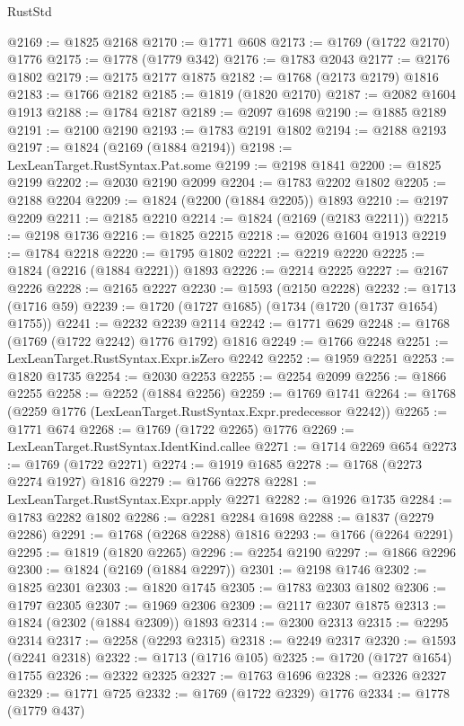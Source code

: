 \begin{lexlean}{RustStd}
\begin{coremodule}
@2169 := @1825 @2168
@2170 := @1771 @608
@2173 := @1769 (@1722 @2170) @1776
@2175 := @1778 (@1779 @342)
@2176 := @1783 @2043
@2177 := @2176 @1802
@2179 := @2175 @2177 @1875
@2182 := @1768 (@2173 @2179) @1816
@2183 := @1766 @2182
@2185 := @1819 (@1820 @2170)
@2187 := @2082 @1604 @1913
@2188 := @1784 @2187
@2189 := @2097 @1698
@2190 := @1885 @2189
@2191 := @2100 @2190
@2193 := @1783 @2191 @1802
@2194 := @2188 @2193
@2197 := @1824 (@2169 (@1884 @2194))
@2198 := LexLeanTarget.RustSyntax.Pat.some
@2199 := @2198 @1841
@2200 := @1825 @2199
@2202 := @2030 @2190 @2099
@2204 := @1783 @2202 @1802
@2205 := @2188 @2204
@2209 := @1824 (@2200 (@1884 @2205)) @1893
@2210 := @2197 @2209
@2211 := @2185 @2210
@2214 := @1824 (@2169 (@2183 @2211))
@2215 := @2198 @1736
@2216 := @1825 @2215
@2218 := @2026 @1604 @1913
@2219 := @1784 @2218
@2220 := @1795 @1802
@2221 := @2219 @2220
@2225 := @1824 (@2216 (@1884 @2221)) @1893
@2226 := @2214 @2225
@2227 := @2167 @2226
@2228 := @2165 @2227
@2230 := @1593 (@2150 @2228)
@2232 := @1713 (@1716 @59)
@2239 := @1720 (@1727 @1685) (@1734 (@1720 (@1737 @1654) @1755))
@2241 := @2232 @2239 @2114
@2242 := @1771 @629
@2248 := @1768 (@1769 (@1722 @2242) @1776 @1792) @1816
@2249 := @1766 @2248
@2251 := LexLeanTarget.RustSyntax.Expr.isZero @2242
@2252 := @1959 @2251
@2253 := @1820 @1735
@2254 := @2030 @2253
@2255 := @2254 @2099
@2256 := @1866 @2255
@2258 := @2252 (@1884 @2256)
@2259 := @1769 @1741
@2264 := @1768 (@2259 @1776 (LexLeanTarget.RustSyntax.Expr.predecessor @2242))
@2265 := @1771 @674
@2268 := @1769 (@1722 @2265) @1776
@2269 := LexLeanTarget.RustSyntax.IdentKind.callee
@2271 := @1714 @2269 @654
@2273 := @1769 (@1722 @2271)
@2274 := @1919 @1685
@2278 := @1768 (@2273 @2274 @1927) @1816
@2279 := @1766 @2278
@2281 := LexLeanTarget.RustSyntax.Expr.apply @2271
@2282 := @1926 @1735
@2284 := @1783 @2282 @1802
@2286 := @2281 @2284 @1698
@2288 := @1837 (@2279 @2286)
@2291 := @1768 (@2268 @2288) @1816
@2293 := @1766 (@2264 @2291)
@2295 := @1819 (@1820 @2265)
@2296 := @2254 @2190
@2297 := @1866 @2296
@2300 := @1824 (@2169 (@1884 @2297))
@2301 := @2198 @1746
@2302 := @1825 @2301
@2303 := @1820 @1745
@2305 := @1783 @2303 @1802
@2306 := @1797 @2305
@2307 := @1969 @2306
@2309 := @2117 @2307 @1875
@2313 := @1824 (@2302 (@1884 @2309)) @1893
@2314 := @2300 @2313
@2315 := @2295 @2314
@2317 := @2258 (@2293 @2315)
@2318 := @2249 @2317
@2320 := @1593 (@2241 @2318)
@2322 := @1713 (@1716 @105)
@2325 := @1720 (@1727 @1654) @1755
@2326 := @2322 @2325
@2327 := @1763 @1696
@2328 := @2326 @2327
@2329 := @1771 @725
@2332 := @1769 (@1722 @2329) @1776
@2334 := @1778 (@1779 @437)

\end{coremodule}
\end{lexlean}
